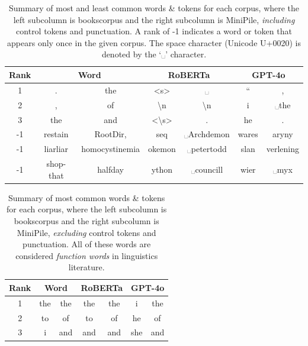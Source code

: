 \documentclass[11pt]{article}
\begin{document}
\begin{table}
    \centering
    \begin{tabular}{|c|c|c|c|c|c|c|}
        \hline
        \textbf{Rank} & \multicolumn{2}{c|}{\textbf{Word}} & \multicolumn{2}{c|}{\textbf{RoBERTa}} & \multicolumn{2}{c|}{\textbf{GPT-4o}}  \\
        \hline
        1 & . & the & <s> & ␣ & `` & , \\
        \hline
        2 & , & of & \textbackslash n & \textbackslash n & i & ␣the \\
        \hline
        3 & the & and & <\textbackslash s> & . & he & . \\
        \hline
        -1 & restain & RootDir, & seq & ␣Archdemon & wares & aryny \\
        \hline
        -1 & liarliar & homocystinemia & okemon & ␣petertodd & slan & verlening \\
        \hline
        -1 & shop-that & halfday & ython & ␣councill & wier & ␣myx \\
        \hline
    \end{tabular}
    \caption{Summary of most and least common words \& tokens for each corpus, where the left subcolumn is bookscorpus and the right subcolumn is MiniPile, \textit{including} control tokens and punctuation. A rank of -1 indicates a word or token that appears only once in the given corpus. The space character (Unicode U+0020) is denoted by the `␣' character.}
    \label{tbl:token ranks}
\end{table}

\begin{table}
    \centering
    \begin{tabular}{|c|c|c|c|c|c|c|}
        \hline
        \textbf{Rank} & \multicolumn{2}{c|}{\textbf{Word}} & \multicolumn{2}{c|}{\textbf{RoBERTa}} & \multicolumn{2}{c|}{\textbf{GPT-4o}}  \\
        \hline
        1 & the & the & the & the & i & the \\
        \hline
        2 & to & of & to & of & he & of \\
        \hline
        3 & i & and & and & and & she & and \\
        \hline
    \end{tabular}
    \caption{Summary of most common words \& tokens for each corpus, where the left subcolumn is bookscorpus and the right subcolumn is MiniPile, \textit{excluding} control tokens and punctuation. All of these words are considered \textit{function words} in linguistics literature.}
    \label{tbl:token ranks no control}
\end{table}
\end{document}
